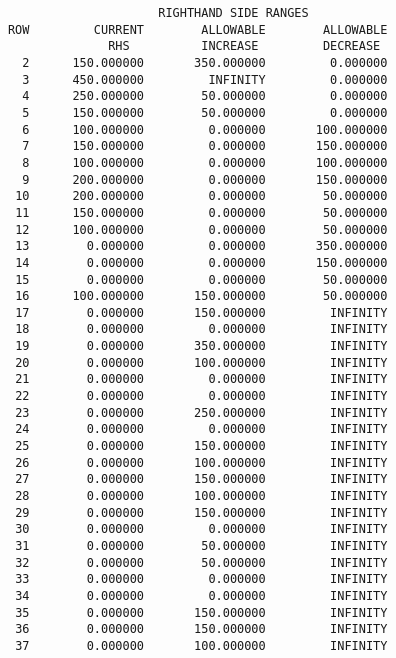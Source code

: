 \documentclass[12pt]{report}
\begin{document}
\begin{verbatim}
                           RIGHTHAND SIDE RANGES
      ROW         CURRENT        ALLOWABLE        ALLOWABLE
                    RHS          INCREASE         DECREASE
        2      150.000000       350.000000         0.000000
        3      450.000000         INFINITY         0.000000
        4      250.000000        50.000000         0.000000
        5      150.000000        50.000000         0.000000
        6      100.000000         0.000000       100.000000
        7      150.000000         0.000000       150.000000
        8      100.000000         0.000000       100.000000
        9      200.000000         0.000000       150.000000
       10      200.000000         0.000000        50.000000
       11      150.000000         0.000000        50.000000
       12      100.000000         0.000000        50.000000
       13        0.000000         0.000000       350.000000
       14        0.000000         0.000000       150.000000
       15        0.000000         0.000000        50.000000
       16      100.000000       150.000000        50.000000
       17        0.000000       150.000000         INFINITY
       18        0.000000         0.000000         INFINITY
       19        0.000000       350.000000         INFINITY
       20        0.000000       100.000000         INFINITY
       21        0.000000         0.000000         INFINITY
       22        0.000000         0.000000         INFINITY
       23        0.000000       250.000000         INFINITY
       24        0.000000         0.000000         INFINITY
       25        0.000000       150.000000         INFINITY
       26        0.000000       100.000000         INFINITY
       27        0.000000       150.000000         INFINITY
       28        0.000000       100.000000         INFINITY
       29        0.000000       150.000000         INFINITY
       30        0.000000         0.000000         INFINITY
       31        0.000000        50.000000         INFINITY
       32        0.000000        50.000000         INFINITY
       33        0.000000         0.000000         INFINITY
       34        0.000000         0.000000         INFINITY
       35        0.000000       150.000000         INFINITY
       36        0.000000       150.000000         INFINITY
       37        0.000000       100.000000         INFINITY

\end{verbatim}
\end{document}
